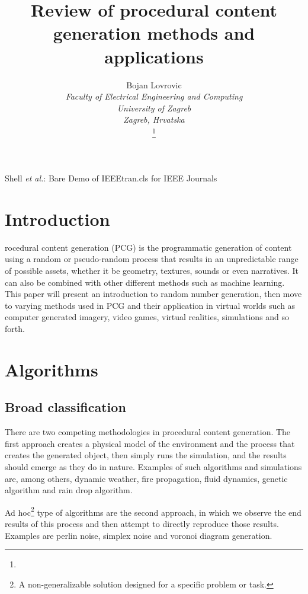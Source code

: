 \documentclass[journal]{IEEEtran}
\begin{document}
\title{Review of procedural content generation methods and applications}

\author{
Bojan Lovrovic\\
\textit{Faculty of Electrical Engineering and Computing}\\
\textit{University of Zagreb}\\
\textit{Zagreb, Hrvatska}

\thanks{}
}

%
{Shell \MakeLowercase{\textit{et al.}}: Bare Demo of IEEEtran.cls for IEEE Journals}

\maketitle

\section{Introduction}
rocedural content generation (PCG) is the programmatic generation of content using a random or pseudo-random process that results in an unpredictable range of possible assets, whether it be geometry, textures, sounds or even narratives. It can also be combined with other different methods such as machine learning. This paper will present an introduction to random number generation, then move to varying methods used in PCG and their application in virtual worlds such as computer generated imagery, video games, virtual realities, simulations and so forth.

\section{Algorithms}
\subsection{Broad classification}
There are two competing methodologies in procedural content generation. The first approach creates a physical model of the environment and the process that creates the generated object, then simply runs the simulation, and the results should emerge as they do in nature. Examples of such algorithms and simulations are, among others, dynamic weather, fire propagation, fluid dynamics, genetic algorithm and rain drop algorithm.
\par
Ad hoc\footnote{A non-generalizable solution designed for a specific problem or task.} type of algorithms are the second approach, in which we observe the end results of this process and then attempt to directly reproduce those results. Examples are perlin noise, simplex noise and voronoi diagram generation.
\end{document}
